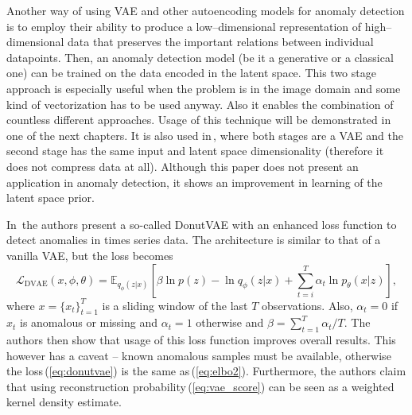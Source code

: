 Another way of using VAE and other autoencoding models for anomaly
detection is to employ their ability to produce a low--dimensional
representation of high--dimensional data that preserves the important
relations between individual datapoints. Then, an anomaly detection
model (be it a generative or a classical one) can be trained on the
data encoded in the latent space. This two stage approach is especially
useful when the problem is in the image domain and some kind of vectorization
has to be used anyway. Also it enables the combination of countless
different approaches. Usage of this technique will be demonstrated
in one of the next chapters. It is also used in\,\cite{dai2019diagnosing},
where both stages are a VAE and the second stage has the same input
and latent space dimensionality (therefore it does not compress data
at all). Although this paper does not present an application in anomaly
detection, it shows an improvement in learning of the latent space
prior. 

In\,\cite{xu2018unsupervised} the authors present a so-called DonutVAE
with an enhanced loss function to detect anomalies in times series
data. The architecture is similar to that of a vanilla VAE, but the
loss becomes
\begin{equation}
\mathcal{L}_{\text{DVAE}}(x,\phi,\theta)=\mathbb{E}_{q_{\phi}(z|x)}\left[\beta\ln p(z)-\ln q_{\phi}(z|x)+\sum_{t=i}^{T}\alpha_{t}\ln p_{\theta}(x|z)\right],\label{eq:donutvae}
\end{equation}
where $x=\{x_{t}\}_{t=1}^{T}$ is a sliding window of the last $T$
observations. Also, $\alpha_{t}=0$ if $x_{t}$ is anomalous or missing
and $\alpha_{t}=1$ otherwise and $\beta=\sum_{t=1}^{T}\alpha_{t}/T$.
The authors then show that usage of this loss function improves overall
results. This however has a caveat -- known anomalous samples must
be available, otherwise the loss\,(\ref{eq:donutvae}) is the same
as\,(\ref{eq:elbo2}). Furthermore, the authors claim that using
reconstruction probability\,(\ref{eq:vae_score}) can be seen as
a weighted kernel density estimate.

